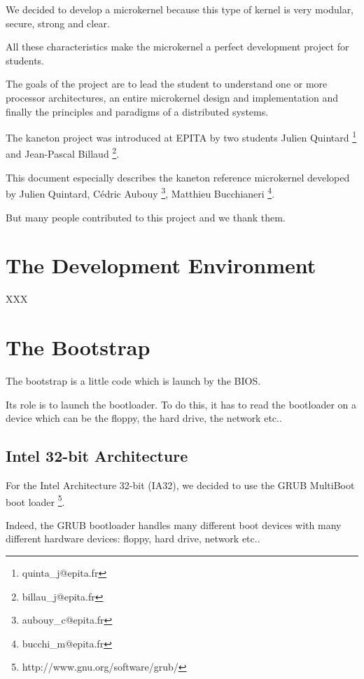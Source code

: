 We decided to develop a microkernel because this type of kernel is very
modular, secure, strong and clear.

All these characteristics make the microkernel a perfect development
project for students.

The goals of the project are to lead the student to understand one or more
processor architectures, an entire microkernel design and implementation
and finally the principles and paradigms of a distributed systems.

The kaneton project was introduced at EPITA by two students
	Julien Quintard
	  \footnote{quinta\_j@epita.fr} and
	Jean-Pascal Billaud
	  \footnote{billau\_j@epita.fr}.

This document especially describes the kaneton reference microkernel
developed by
	Julien Quintard,
	C\'edric Aubouy
	  \footnote{aubouy\_c@epita.fr},
	Matthieu Bucchianeri
	  \footnote{bucchi\_m@epita.fr}.

But many people contributed to this project and we thank them.



%
%

\section{The Development Environment}

XXX

%
%

%
%

\section{The Bootstrap}

The bootstrap is a little code which is launch by the BIOS.

Its role is to launch the bootloader. To do this, it has to read the
bootloader on a device which can be the floppy, the hard drive,
the network etc..

\subsection{Intel 32-bit Architecture}

For the Intel Architecture 32-bit (IA32), we decided to use the
	GRUB MultiBoot boot loader
	  \footnote{http://www.gnu.org/software/grub/}.

Indeed, the GRUB bootloader handles many different boot devices with
many different hardware devices: floppy, hard drive, network etc..

